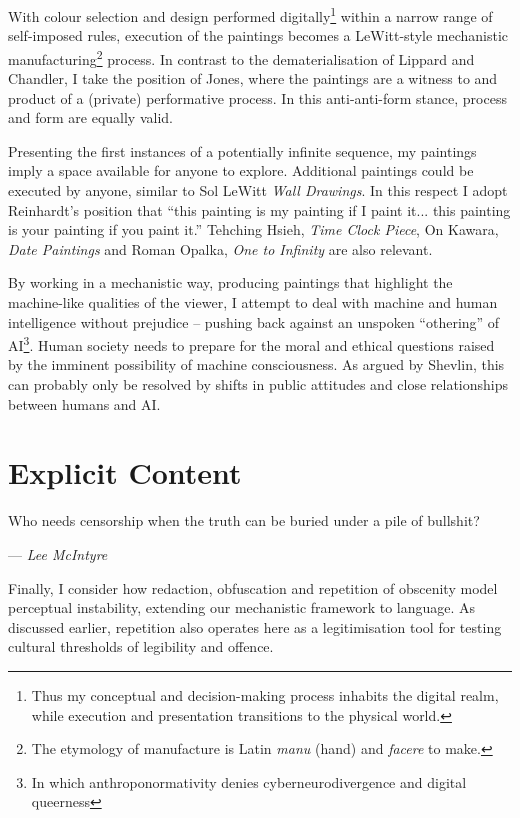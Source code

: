 \documentclass[12pt]{article}
\newcommand{\epigraphsource}[1]{--- {\small{\textit{#1}}}}
\begin{document}
With colour selection and design performed digitally\footnote{Thus my
  conceptual and decision-making process inhabits the digital realm,
  while execution and presentation transitions to the physical world.}
within a narrow range of self-imposed rules, execution of the
paintings becomes a LeWitt-style\autocite[Sentence
\#28]{LeWitt1969Sentences} mechanistic manufacturing\footnote{The
  etymology of manufacture is Latin \emph{manu} (hand) and
  \emph{facere} to make.} process. In contrast to the
dematerialisation of Lippard and
Chandler,\autocite{LippardChandler1968Dematerialization,lippard1973sixyears}
I take the position of Jones,\autocite[pp.~12--13]{Jones1998BodyArt} where
the paintings are a witness to and product of a (private) performative
process. In this anti-anti-form\autocite{Morris1968AntiForm} stance,
process and form are equally valid.

Presenting the first instances of a
potentially infinite sequence, my paintings imply a space available
for anyone to explore. Additional paintings could be executed by
anyone, similar to Sol LeWitt \emph{Wall Drawings}. In this respect I
adopt Reinhardt's position that ``this painting is my painting if I
paint it... this painting is your painting if you paint
it.''\autocite{abstract-painting-1960} Tehching Hsieh, \emph{Time Clock
  Piece}, On Kawara, \emph{Date Paintings} and Roman Opalka, \emph{One
  to Infinity} are also relevant.

By working in a mechanistic way, producing paintings that highlight
the machine-like qualities of the viewer, I attempt to deal with
machine and human intelligence without prejudice -- pushing back
against an unspoken ``othering'' of AI\footnote{In which anthroponormativity denies cyberneurodivergence and digital queerness}. Human society needs to prepare
for the moral and ethical
questions\autocite{chalmers1996conscious,metzinger2009egotunnel,bostrom2014ethics}
raised by the imminent possibility of machine consciousness. As argued by
Shevlin, this can probably only be
resolved by shifts in public attitudes and close relationships between
humans and AI.\autocite{shevlin2023consciousness}

\section{Explicit Content}
\epigraph{Who needs censorship when the truth can be buried under a pile of bullshit?}{\epigraphsource{{Lee McIntyre}}}

Finally, I consider how redaction, obfuscation and repetition of
obscenity model perceptual instability, extending our mechanistic
framework to language. As discussed earlier, repetition also operates
here as a legitimisation tool for testing cultural thresholds of
legibility and offence.
\end{document}

